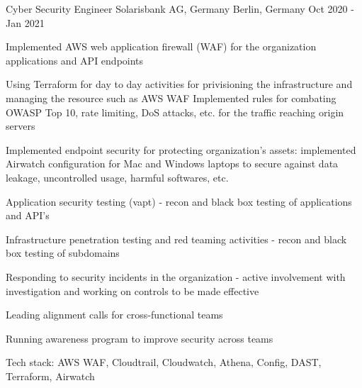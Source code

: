 \begin{cventries}
\cventry
    {Cyber Security Engineer} %
    {Solarisbank AG, Germany} %
    {Berlin, Germany} %
    {Oct 2020 - Jan 2021} %
    {
      \begin{cvitems} %
        \item {Implemented AWS web application firewall (WAF) for the organization applications and API endpoints
        \item Using Terraform for day to day activities for privisioning the infrastructure and managing the resource such as AWS WAF Implemented rules for combating OWASP Top 10, rate limiting, DoS attacks, etc. for the traffic reaching origin servers}
        \item {Implemented endpoint security for protecting organization's assets: implemented Airwatch configuration for Mac and Windows laptops to secure against data leakage, uncontrolled usage, harmful softwares, etc.}
        \item {Application security testing (vapt) - recon and black box testing of applications and API's}
        \item {Infrastructure penetration testing and red teaming activities  - recon and black box testing of subdomains}
        \item {Responding to security incidents in the organization - active involvement with investigation and working on controls to be made effective}
        \item {Leading alignment calls for cross-functional teams}
        \item {Running awareness program to improve security across teams}
        \item {Tech stack: AWS WAF, Cloudtrail, Cloudwatch, Athena, Config, DAST, Terraform, Airwatch}
      \end{cvitems}
    }


\end{cventries}
